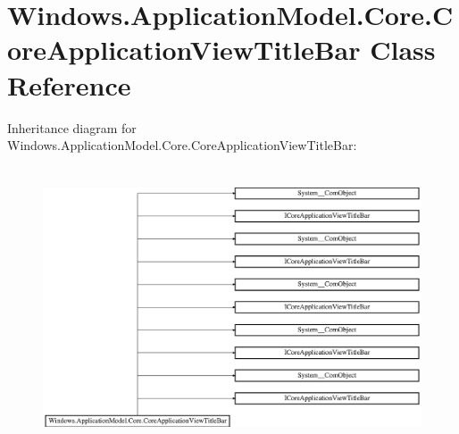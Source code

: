\hypertarget{class_windows_1_1_application_model_1_1_core_1_1_core_application_view_title_bar}{}\section{Windows.\+Application\+Model.\+Core.\+Core\+Application\+View\+Title\+Bar Class Reference}
\label{class_windows_1_1_application_model_1_1_core_1_1_core_application_view_title_bar}
Inheritance diagram for Windows.\+Application\+Model.\+Core.\+Core\+Application\+View\+Title\+Bar\+:\begin{figure}[H]
\begin{center}
\leavevmode
\includegraphics[height=8.324325cm]{class_windows_1_1_application_model_1_1_core_1_1_core_application_view_title_bar}
\end{center}
\end{figure}
